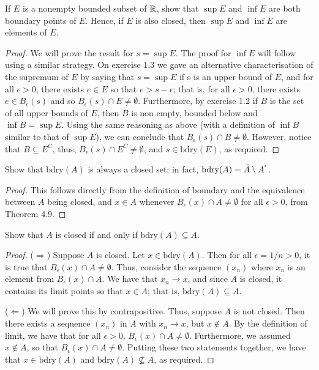 \begin{exercise}{42}
If $E$ is a nonempty bounded subset of $\R$, show that $\sup E$ and $\inf E$ are both boundary points of $E$. Hence, if $E$ is also closed, then $\sup E$ and $\inf E$ are elements of $E$.
\end{exercise}
\begin{proof}
We will prove the result for $s=\sup E$.
The proof for $\inf E$ will follow using a similar strategy.
On exercise 1.3 we gave an alternative characterisation of the supremum of $E$ by saying that $s=\sup E$ if s is an upper bound of $E$, and for all $\epsilon>0$, there exists $e\in E$ so that $e>s-\epsilon$;
that is, for all $\epsilon>0$, there exists $e\in B_\epsilon(s)$ and so $B_\epsilon(s)\cap E\neq\emptyset$.
Furthermore, by exercise 1.2 if $B$ is the set of all upper bounds of $E$, then $B$ is non empty, bounded below and $\inf B=\sup E$.
Using the same reasoning as above (with a definition of $\inf B$ similar to that of $\sup E$), we can conclude that $B_\epsilon(s)\cap B\neq\emptyset$.
However, notice that $B\subseteq E^C$, thus, $B_\epsilon(s)\cap E^C\neq\emptyset$, and $s\in\text{bdry}(E)$, as required.
\end{proof} 

\begin{exercise}{43}
Show that $\text{bdry}(A)$ is always a closed set; 
in fact, $\text{bdry}(A)=\bar{A}\setminus A^\text{\degree}$.
\end{exercise}
\begin{proof}
This follows directly from the definition of boundary and the equivalence between $A$ being closed, and $x\in A$ whenever $B_\epsilon(x)\cap A \neq\emptyset$ for all $\epsilon>0$, from Theorem 4.9.
\end{proof} 

\begin{exercise}{44}
Show that $A$ is closed if and only if $\text{bdry}(A)\subseteq A$.
\end{exercise}
\begin{proof}
($\Rightarrow$)
Suppose $A$ is closed.
Let $x\in\text{bdry}(A)$.
Then for all $\epsilon=1/n>0$, it is true that $B_\epsilon(x)\cap A\neq\emptyset$.
Thus, consider the sequence $(x_n)$ where $x_n$ is an element from $B_\epsilon(x)\cap A$.
We have that $x_n\to x$, and since $A$ is closed, it contains its limit points so that $x\in A$;
that is, $\text{bdry}(A)\subseteq A$.

($\Leftarrow$) 
We will prove this by contrapositive.
Thus, suppose $A$ is not closed.
Then there exists a sequence $(x_n)$ in $A$ with $x_n\to x$, but $x\notin A$.
By the definition of limit, we have that for all $\epsilon>0$, $B_\epsilon(x)\cap A\neq\emptyset$.
Furthermore, we assumed $x\notin A$, so that $B_\epsilon(x)\cap A\neq\emptyset$.
Putting these two statements together, we have that $x\in\text{bdry}(A)$ and $\text{bdry}(A)\not\subseteq A$, as required.
\end{proof} 


